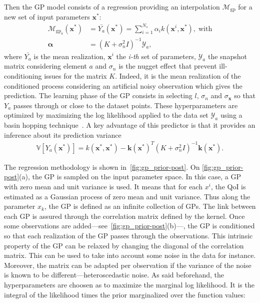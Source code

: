 Then the GP model consists of a regression providing an interpolation $\mathcal{M}_{\text{gp}}$ for a new set of input parameters $\mathbf{x^{*}}$:
\begin{align}
\mathcal{M}_{\text{gp}_{a}}(\mathbf{x}^*)&=\bar{Y_{a}}(\mathbf{x}^*) =  \sum_{i = 1}^{N_s}\alpha_i k (\mathbf{x}^i, \mathbf{x}^*), \;\text{with} \\
\mathbf{\alpha} &= (K + \sigma_n^2 I)^{-1}\mathcal{Y}_a, \nonumber
\end{align}
where $\bar{Y_a}$ is the mean realization, $\mathbf{x}^i$ the \textit{i-th} set of parameters, $\mathcal{Y}_{a}$ the snapshot matrix considering element $a$ and $\sigma_n$ is the nugget effect that prevent ill-conditioning issues for the matrix $K$. Indeed, it is the mean realization of the conditioned process considering an artificial noisy observation which gives the prediction. The learning phase of the GP consists in selecting $l$, $\sigma_n$ and $\sigma_\mathbf{x}$ so that $Y_a$ passes through or close to the dataset points. These hyperparameters are optimized by maximizing the log likelihood applied to the data set $\mathcal{Y}_a$ using a basin hopping technique~\citep{wales1997}. A key advantage of this predictor is that it provides an inference about its prediction variance
\begin{align}
\mathbb{V}[Y_{a}(\mathbf{x}^*)] = k(\mathbf{x}^*, \mathbf{x}^*)-\mathbf{k}(\mathbf{x}^*)^T(K + \sigma_n^2 I)^{-1}\mathbf{k}(\mathbf{x}^*).
\end{align}

The regression methodology is shown in~\cref{fig:gp_prior-post}. On \cref{fig:gp_prior-post}(a), the GP is sampled on the input parameter space. In this case, a GP with zero mean and unit variance is used. It means that for each $x^i$, the QoI is estimated as a Gaussian process of zero mean and unit variance. Thus along the parameter $x_{k}$, the GP is defined as an infinite collection of GPs. The link between each GP is assured through the correlation matrix defined by the kernel. Once some observations are added---see~\cref{fig:gp_prior-post}(b)---, the GP is conditioned so that each realization of the GP passes through the observations. This intrinsic property of the GP can be relaxed by changing the diagonal of the correlation matrix. This can be used to take into account some noise in the data for instance. Moreover, the matrix can be adapted per observation if the variance of the noise is known to be different---heteroscedastic noise. As said beforehand, the hyperparameters are choosen as to maximize the marginal log likelihood. It is the integral of the likelihood times the prior marginalized over the function values:

